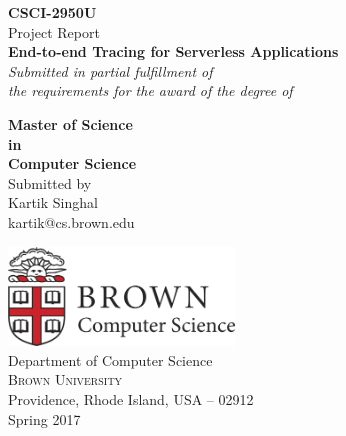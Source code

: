 \begin{titlepage}

\begin{center}

\textup{\small {\bf CSCI-2950U} \\ Project Report}\\[0.5in]

\Large \textbf {End-to-end Tracing for Serverless Applications}\\[1in]

       \small \emph{Submitted in partial fulfillment of\\
        the requirements for the award of the degree of}
        \vspace{.4in}

       {\bf Master of Science \\in\\ Computer Science}\\[0.6in]

\normalsize Submitted by \\

\Large Kartik Singhal \\

\normalsize kartik@cs.brown.edu


\vfill

\includegraphics[width=0.45\textwidth]{./brown_cs_logo}\\[0.1in]
\Large{Department of Computer Science}\\
\normalsize
\textsc{Brown University}\\
Providence, Rhode Island, USA -- 02912 \\
\vspace{0.2cm}
Spring 2017

\end{center}

\end{titlepage}
